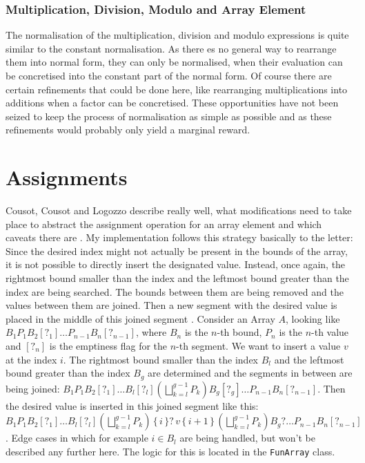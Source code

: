 \subsubsection{Multiplication, Division, Modulo and Array Element}

The normalisation of the multiplication, division and modulo expressions is quite similar to the constant normalisation. As there es no general way to rearrange them into normal form, they can only be normalised, when their evaluation can be concretised into the constant part of the normal form. Of course there are certain refinements that could be done here, like rearranging multiplications into additions when a factor can be concretised. These opportunities have not been seized to keep the process of normalisation as simple as possible and as these refinements would probably only yield a marginal reward. 








\section{Assignments}\label{sec:assignments}

Cousot, Cousot and Logozzo describe really well, what modifications need to take place to abstract the assignment operation for an array element and which caveats there are \cite[section 11.6]{cousot2011}. My implementation follows this strategy basically to the letter:
Since the desired index might not actually be present in the bounds of the array, it is not possible to directly insert the designated value. Instead, once again, the rightmost bound smaller than the index and the leftmost bound greater than the index are being searched. The bounds between them are being removed and the values between them are joined. Then a new segment with the desired value is placed in the middle of this joined segment \cite{cousot2011}. Consider an Array $A$, looking like $B_1P_1B_2[?_1]\ldots P_{n-1}B_n[?_{n-1}]$, where $B_n$ is the $n$-th bound, $P_n$ is the $n$-th value and $[?_{n}]$ is the emptiness flag for the $n$-th segment. We want to insert a value $v$ at the index $i$. The rightmost bound smaller than the index $B_l$ and the leftmost bound greater than the index $B_g$ are determined and the segments in between are being joined: $B_1P_1B_2[?_1]\ldots B_l[?_l] (\bigsqcup^{g-1}_{k=l}P_k) B_g[?_g]\ldots P_{n-1}B_n[?_{n-1}]$. Then the desired value  is inserted in this joined segment like this: $B_1P_1B_2[?_1]\ldots\allowbreak B_l[?_l] (\bigsqcup^{g-1}_{k=l}P_k)\allowbreak\, \{\,i\,\}?\, v \,\{\,i+1\,\}\, \allowbreak(\bigsqcup^{g-1}_{k=l}P_k) B_g?\ldots \allowbreak P_{n-1}B_n[?_{n-1}]$ \cite{cousot2011}. Edge cases in which for example $i\in B_l$ are being handled, but won't be described any further here.  The logic for this is located in the \texttt{FunArray} class. 

